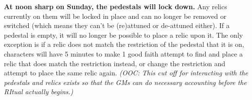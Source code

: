 \documentclass[green]{GL2020}
\begin{document}
\textbf{At noon sharp on Sunday, the pedestals will lock down.} Any relics currently on them will be locked in place and can no longer be removed or switched (which means they can’t be (re)attuned or de-attuned either). If a pedestal is empty, it will no longer be possible to place a relic upon it. The only exception is if a relic does not match the restriction of the pedestal that it is on, characters will have 5 minutes to make 1 good faith attempt to find and place a relic that does match the restriction instead, or change the restriction and attempt to place the same relic again. \emph{(OOC: This cut off for interacting with the pedestals and relics exists so that the GMs can do necessary accounting before the RItual actually begins.)}
\end{document}
